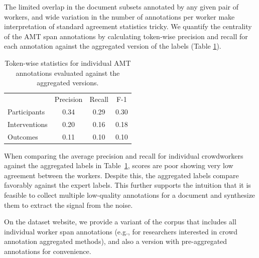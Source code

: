 \documentclass[11pt,a4paper]{article}
\begin{document}
The limited overlap in the document subsets annotated by any given pair of workers, and wide variation in the number of annotations per worker make interpretation of standard agreement statistics tricky. We quantify the centrality of the AMT span annotations by calculating token-wise precision and recall for each annotation against the aggregated version of the labels (Table \ref{tab:amt_span_stats}). 



\begin{table}[h]%
    \centering
    \small
    \begin{tabular}{ l c c c } 
        \textbf{} & Precision & Recall & F-1\\
        \cline{2-4}
        Participants  & 0.34 & 0.29 & 0.30 \\
        Interventions & 0.20 & 0.16 & 0.18 \\ 
        Outcomes      & 0.11 & 0.10 & 0.10 \\ 
    \end{tabular}
    \caption{Token-wise statistics for individual AMT annotations evaluated against the aggregated versions.}
   	\label{tab:amt_span_stats}
\end{table}

When comparing the average precision and recall for individual crowdworkers against the aggregated labels in Table~\ref{tab:amt_span_stats}, scores are poor showing very low agreement between the workers.
Despite this, the aggregated labels compare favorably against the expert labels. This further supports the intuition that it is feasible to collect multiple low-quality annotations for a document and synthesize them to extract the signal from the noise.

On the dataset website, we provide a variant of the corpus that includes all individual worker span annotations (e.g., for researchers interested in crowd annotation aggregated methods), and also a version with pre-aggregated annotations for convenience.
\end{document}

